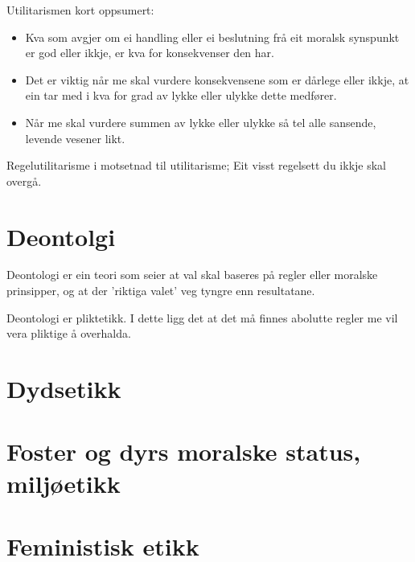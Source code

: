 \documentclass[a4paper]{IEEEtran}
\begin{document}
Utilitarismen kort oppsumert:\bigskip
\begin{itemize}
    \item Kva som avgjer om ei handling eller ei beslutning frå eit moralsk synspunkt er god eller ikkje, er kva for konsekvenser den har.
    \item Det er viktig når me skal vurdere konsekvensene som er dårlege eller ikkje, at ein tar med i kva for grad av lykke eller ulykke dette medfører.
    \item Når me skal vurdere summen av lykke eller ulykke så tel alle sansende, levende vesener likt. 
\end{itemize}

Regelutilitarisme i motsetnad til utilitarisme; Eit visst regelsett du ikkje skal overgå.
\bigskip

\newpage
\section{Deontolgi}
\label{deontologi}

Deontologi er ein teori som seier at val skal baseres på regler eller moralske prinsipper, og at der 'riktiga valet' veg tyngre enn resultatane.

Deontologi er pliktetikk. I dette ligg det at det må finnes abolutte regler me vil vera pliktige å overhalda. 
\section{Dydsetikk}
\label{dydsetikk}


\section{Foster og dyrs moralske status, miljøetikk}
\label{fdms}


\section{Feministisk etikk}
\label{femimisme}
\end{document}
